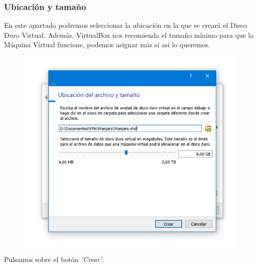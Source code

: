 \subsubsection{Ubicación y tamaño}
\noindent
En este apartado podremos seleccionar la ubicación en la que se creará el Disco Duro Virtual. Además, VirtualBox nos recomienda el tamaño mínimo para que la Máquina Virtual funcione, podemos asignar más si así lo queremos.
\begin{figure}[H]
        \centering
        \includegraphics[width= 0.7 \textwidth]{Media/VB7.png}
    \end{figure}
\newline \noindent Pulsamos sobre el botón \textit{'Crear'}.

